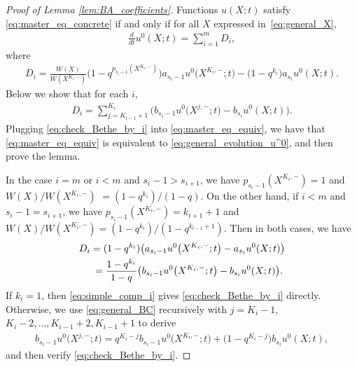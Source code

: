 \begin{proof}[Proof of Lemma \ref{lem:BA_coefficients}]
 Functions $u(X; t)$ satisfy \eqref{eq:master_eq_concrete} if and only if for all $X$ expressed in~\eqref{eq:general_X},
 \begin{gather} \label{eq:master_eq_equiv}
 \frac{d}{dt} u^0(X; t) = \sum^m_{i = 1} D_i,
 \end{gather}
 where
 \begin{gather*}
 D_i = \frac{W(X)}{W(X^{K_i, -})} \big(1 - q^{p_{s_i - 1}(X^{K_i, -})}\big) a_{s_i - 1} u^0\big(X^{K_i, -}; t\big) - \big(1 - q^{k_i}\big) a_{s_i} u^0(X; t).
 \end{gather*}
 Below we show that for each $i$,
 \begin{gather} \label{eq:check_Bethe_by_i}
 D_i = \sum^{K_i}_{j = K_{i - 1} + 1} \big( b_{s_i - 1} u^0\big(X^{ j, -}; t\big) - b_{s_i} u^0(X; t) \big).
 \end{gather}
 Plugging \eqref{eq:check_Bethe_by_i} into \eqref{eq:master_eq_equiv}, we have that \eqref{eq:master_eq_equiv} is equivalent to \eqref{eq:general_evolution_u^0}, and then prove the lemma.

 In the case $i = m$ or $i < m$ and $s_{i} - 1 > s_{i + 1}$, we have $p_{s_i - 1}(X^{K_i, -}) = 1$ and $W(X)/W(X^{K_i, -})$ $= (1 - q^{k_i})/(1 - q)$. On the other hand, if $i < m$ and $s_i - 1 = s_{i + 1}$, we have $p_{s_i - 1}(X^{K_i, -}) = k_{i + 1} + 1$ and $W(X)/W(X^{K_i, -}) = (1 - q^{k_i})/(1 - q^{k_{i - 1} + 1})$. Then in both cases, we have
 \begin{gather}
 D_i = (1 - q^{k_i}) \big( a_{s_i - 1} u^0\big(X^{K_i, -}; t\big) - a_{s_i} u^0(X; t) \big) \nonumber\\
 \hphantom{D_i}{} = \frac{1 - q^{k_i}}{1 - q} \big( b_{s_i - 1} u^0\big(X^{K_i, -}; t\big) - b_{s_i} u^0(X; t) \big).\label{eq:simple_comp_i}
 \end{gather}
 If $k_i = 1$, then \eqref{eq:simple_comp_i} gives \eqref{eq:check_Bethe_by_i} directly. Otherwise, we use \eqref{eq:general_BC} recursively with $j = K_i - 1$, $K_i - 2, \dotsc, K_{i - 1} + 2, K_{i - 1} + 1$ to derive
 \begin{gather*}
 b_{s_i - 1} u^0\big(X^{j, -}; t\big) = q^{K_i - j} b_{s_i - 1} u^0\big(X^{K_i, -}; t\big) + \big(1 - q^{K_i - j}\big) b_{s_i} u^0(X; t),
 \end{gather*}
 and then verify \eqref{eq:check_Bethe_by_i}.
\end{proof}

